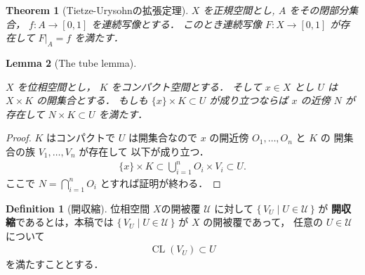 \documentclass[leqno, a4paper, 12pt]{jsarticle}
\theoremstyle{plain}
\newtheorem{thm}{Theorem}[section]
\newtheorem{lem}[thm]{Lemma}
\theoremstyle{definition}
\newtheorem{df}{Definition}[section]
\theoremstyle{remark}
\DeclareMathOperator{\cl}{\mathrm{CL}}
\newcommand{\yoemph}[1]{\textbf{#1}}
\newcommand{\yocovf}[1]{\mathscr{#1}}
\numberwithin{equation}{section}
\begin{document}
\begin{thm}[Tietze-Urysohnの拡張定理]\label{thm:secpre:tuext}
$X$
を正規空間とし,
$A$
をその閉部分集合，
$f\colon A\to [0, 1]$
を連続写像とする．
このとき連続写像
$F\colon X\to [0, 1]$
が存在して
$F|_{A}=f$
を満たす．
\end{thm}
\begin{lem}[The tube lemma]\label{lem:tube}

$X$
を位相空間とし，
$K$
をコンパクト空間とする．
そして
$x\in X$
とし
$U$
は
$X\times K$
の開集合とする．
もしも
$\{x\}\times K\subset U$
が成り立つならば
$x$
の近傍
$N$
が存在して
$N\times K\subset U$
を満たす．
\end{lem}
\begin{proof}
$K$
はコンパクトで
$U$
は開集合なので
$x$
の開近傍
$O_{1}, \dots, O_{n}$
と
$K$
の
開集合の族
$V_{1}, \dots, V_{n}$
が存在して
以下が成り立つ．
\begin{align}
\{x\}\times K\subset \bigcup_{i=1}^{n}O_{i}\times V_{i}\subset U. 
\end{align}
ここで
$N=\bigcap_{i=1}^{n}O_{i}$
とすれば証明が終わる．
\end{proof}

\begin{df}[開収縮]
位相空間
$X$の開被覆
$\yocovf{U}$
に対して
$\{\, V_{U} \mid  U\in \yocovf{U}\,  \}$
が
\yoemph{開収縮}であるとは，本稿では
$\{\, V_{U} \mid  U\in \yocovf{U} \, \}$
が
$X$
の開被覆であって，
任意の
$U\in \yocovf{U}$
について
\begin{align}
\cl (V_{U})\subset U
\end{align}
を満たすこととする．
\end{df}
\end{document}
